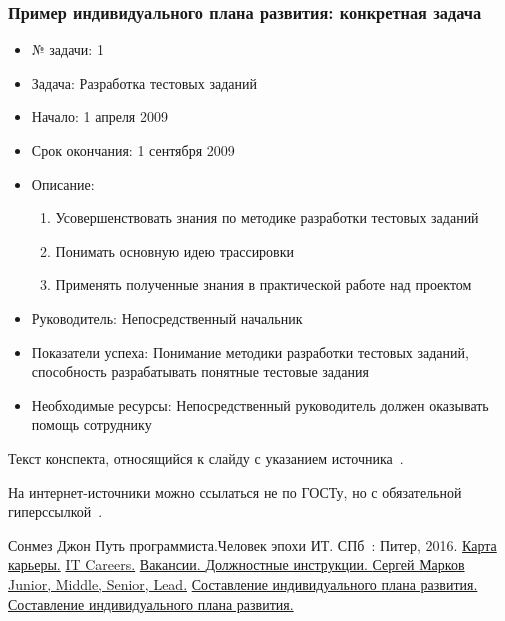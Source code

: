 \documentclass{../industrial-development}
\begin{document}
\begin{frame} \frametitle{Пример индивидуального плана развития: конкретная задача }

\begin{itemize}
  \item № задачи: 1
  \item Задача: Разработка тестовых заданий
 \item Начало: 1 апреля 2009 
  \item Срок окончания: 1 сентября 2009 
  \item Описание: \begin{enumerate}
 \item Усовершенствовать знания по методике разработки тестовых заданий
\item Понимать основную идею трассировки
\item Применять полученные знания в практической работе над проектом
  \end{enumerate}
  \item Руководитель: Непосредственный начальник
  \item Показатели успеха: Понимание методики разработки тестовых заданий, способность разрабатывать понятные тестовые задания
  \item Необходимые ресурсы: Непосредственный руководитель должен оказывать помощь сотруднику
  \end{itemize}



\end{frame}

\lecturenotes

Текст конспекта, относящийся к слайду с указанием источника~\cite[с.~97--99]{Brooks}.

На интернет-источники можно ссылаться не по ГОСТу, но с обязательной гиперссылкой~\cite{Fowler}.

\begin{thebibliography}{99}
 Сонмез Джон Путь программиста.Человек эпохи ИТ. СПб~: Питер, 2016.
 \href{https://dou.ua/lenta/columns/karta-kariery/?from=foo}{ Карта карьеры.}
 \href{https://www.itcareerfinder.com/it-careers.html}{ IT Careers.}
 \href{https://hh.ru}{ Вакансии. }
 \href{https://www.rabotka.ru/job_description/}{ Должностные инструкции. }
 \href{http://www.dataart.ru/news/junior-middle-senior-lead-etc-v-chem-raznitsa/}{ Сергей Марков Junior, Middle, Senior, Lead.}
 \href{http://www.e-reading.club/chapter.php/1050422/98/Beron_-_Upravlenie_rezultativnostyu.html}{ Составление индивидуального плана развития.}
 \href{http://www.sbsc.ru/books/TalentWarBook.pdf}{ Составление индивидуального плана развития.}
\end{thebibliography}
\end{document}
